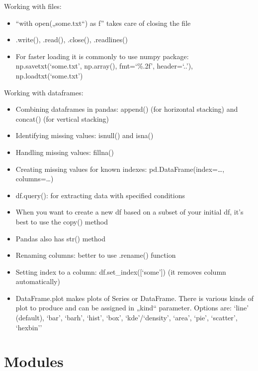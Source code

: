 \documentclass[
  letterpaper,
]{book}
\providecommand{\tightlist}{%
  \setlength{\itemsep}{0pt}\setlength{\parskip}{0pt}}\usepackage{longtable,booktabs,array}
\begin{document}
Working with files:

\begin{itemize}
\tightlist
\item
  ``with open(„some.txt``) as f'' takes care of closing the file
\item
  .write(), .read(), .close(), .readlines()
\item
  For faster loading it is commonly to use numpy package:
  np.savetxt(`some.txt', np.array(), fmt=`\%.2f', header=`..'),
  np.loadtxt(`some.txt')
\end{itemize}

Working with dataframes:

\begin{itemize}
\tightlist
\item
  Combining dataframes in pandas: append() (for horizontal stacking) and
  concat() (for vertical stacking)
\item
  Identifying missing values: isnull() and isna()
\item
  Handling missing values: fillna()
\item
  Creating missing values for known indexes: pd.DataFrame(index=\ldots,
  columns=\ldots)
\item
  df.query(): for extracting data with specified conditions
\item
  When you want to create a new df based on a subset of your initial df,
  it's best to use the copy() method
\item
  Pandas also has str() method
\item
  Renaming columns: better to use .rename() function
\item
  Setting index to a column: df.set\_index({[}`some'{]}) (it removes
  column automatically)
\item
  DataFrame.plot makes plots of Series or DataFrame. There is various
  kinds of plot to produce and can be assigned in „kind`` parameter.
  Options are: `line' (default), `bar', `barh', `hist', `box',
  `kde'/`density', `area', `pie', `scatter', `hexbin''
\end{itemize}

\hypertarget{modules}{%
\section{Modules}\label{modules}}
\end{document}
